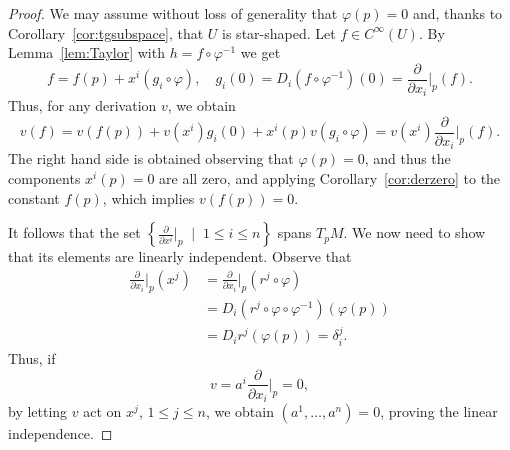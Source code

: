 \begin{proof}
  We may assume without loss of generality that $\varphi(p) = 0$ and, thanks to Corollary~\ref{cor:tgsubspace}, that $U$ is star-shaped.
  Let $f\in C^\infty(U)$.
  By Lemma~\ref{lem:Taylor} with $h = f \circ \varphi^{-1}$ we get
  \begin{equation}
    f = f(p) + x^i (g_i \circ \varphi),
    \quad g_i(0) = D_i (f \circ \varphi^{-1})(0) = \frac{\partial}{\partial x_i}\Big|_p(f).
  \end{equation}
  Thus, for any derivation $v$, we obtain
  \begin{equation}
    v(f) = v(f(p)) + v(x^i)g_i(0) + x^i(p) v(g_i\circ\varphi) = v(x^i)  \frac{\partial}{\partial x_i}\Big|_p(f).
  \end{equation}
  The right hand side is obtained observing that $\varphi(p) = 0$, and thus the components $x^i(p) = 0$ are all zero, and applying Corollary~\ref{cor:derzero} to the constant $f(p)$, which implies $v(f(p)) = 0$.

  It follows that the set $\left\{\frac{\partial}{\partial x^i}\Big|_p\;\mid\; 1\leq i\leq n\right\}$ spans $T_p M$.
  We now need to show that its elements are linearly independent.
  Observe that
  \begin{align}
    \frac{\partial}{\partial x_i}\Big|_p (x^j) & =
    \frac{\partial}{\partial x_i}\Big|_p (r^j \circ \varphi)                                               \\
                                               & = D_i (r^j \circ \varphi \circ \varphi^{-1}) (\varphi(p)) \\
                                               & = D_i r^j(\varphi(p)) = \delta^j_i.
  \end{align}
  Thus, if
  \begin{equation}
    v = a^i \frac{\partial}{\partial x_i}\Big|_p = 0,
  \end{equation}
  by letting $v$ act on $x^j$, $1\leq j\leq n$, we obtain $(a^1, \ldots, a^n) = 0$, proving the linear independence.
\end{proof}

